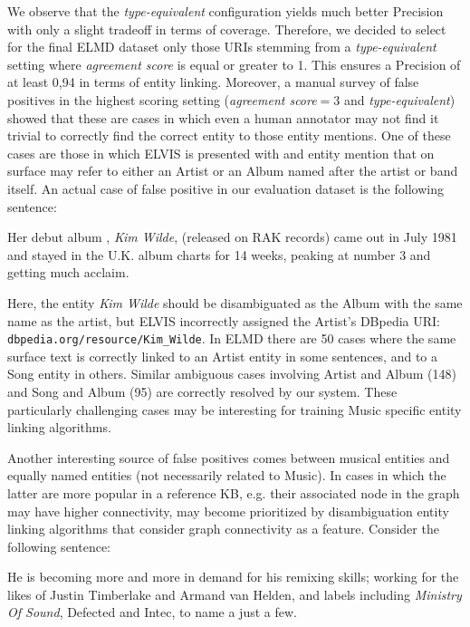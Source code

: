 We observe that the \textit{type-equivalent} configuration yields much better Precision with only a slight tradeoff in terms of coverage. Therefore, we decided to select for the final \textsc{ELMD} dataset only those URIs stemming from a \textit{type-equivalent} setting where \textit{agreement score} is equal or greater to 1. This ensures a Precision of at least 0,94 in terms of entity linking. Moreover, a manual survey of false positives in the highest scoring setting (\textit{agreement score}$=3$ and \textit{type-equivalent}) showed that these are cases in which even a human annotator may not find it trivial to correctly find the correct entity to those entity mentions. One of these cases are those in which \textsc{ELVIS} is presented with and entity mention that on surface may refer to either an Artist or an Album named after the artist or band itself. An actual case of false positive in our evaluation dataset is the following sentence:
\begin{adjustwidth}{2.5em}{20pt}
\begin{center}
Her debut album , \textit{Kim Wilde}, (released on RAK records) came out in July 1981 and stayed in the U.K. album charts for 14 weeks, peaking at number 3 and getting much acclaim.
\end{center}
\end{adjustwidth}

Here, the entity \textit{Kim Wilde} should be disambiguated as the Album with the same name as the artist, but \textsc{ELVIS} incorrectly assigned the Artist's DBpedia URI: {\footnotesize{\texttt{dbpedia.org/resource/Kim\_Wilde}}}. In \textsc{ELMD} there are 50 cases where the same surface text is correctly linked to an Artist entity in some sentences, and to a Song entity in others. Similar ambiguous cases involving Artist and Album (148) and Song and Album (95) are correctly resolved by our system. These particularly challenging cases may be interesting for training Music specific entity linking algorithms.

Another interesting source of false positives comes between musical entities and equally named entities (not necessarily related to Music). In cases in which the latter are more popular in a reference KB, e.g. their associated node in the graph may have higher connectivity, may become prioritized by disambiguation entity linking algorithms that consider graph connectivity as a feature. Consider the following sentence:

\begin{adjustwidth}{2.5em}{20pt}
\begin{center}
He is becoming more and more in demand for his remixing skills; working for the likes of Justin Timberlake and Armand van Helden, and labels including \textit{Ministry Of Sound}, Defected and Intec, to name a just a few.
\end{center}
\end{adjustwidth}

